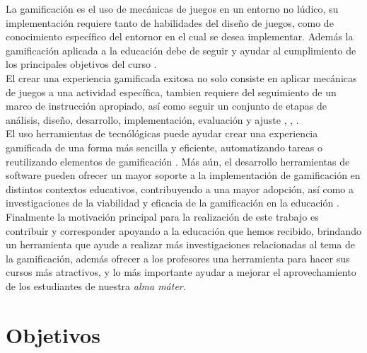 
 \noindent La gamificación es el uso de mecánicas de juegos en un entorno no lúdico, su implementación requiere
 tanto de habilidades del diseño de juegos, como de conocimiento específico del entornor en el cual se desea
 implementar. Además la gamificación aplicada a la educación debe de seguir y ayudar al cumplimiento de los
 principales objetivos del curso \cite{ForTheWin}.\\ %


 \noindent El crear una experiencia gamificada exitosa no solo consiste en aplicar mecánicas de juegos a una
 actividad específica, tambien requiere del seguimiento de un marco de instrucción apropiado, así como seguir
 un conjunto de etapas de análisis, diseño, desarrollo, implementación, evaluación y ajuste
 \cite[p. 39]{Octalysis}, \cite[p. 1110]{GamInE-Learning}, \cite{ForTheWin}.\\


 \noindent El uso herramientas de tecnólógicas puede ayudar crear una experiencia gamificada de una
 forma más sencilla y eficiente, automatizando tareas o reutilizando elementos de gamificación \cite{Wood-Reiners}.
 Más aún, el desarrollo herramientas de software pueden ofrecer un mayor soporte a la implementación de
 gamificación en distintos contextos educativos, contribuyendo a una mayor adopción, así como a investigaciones
 de la viabilidad y eficacia de la gamificación en la educación \cite[p. 10]{mappingStudy}.\\


 \noindent Finalmente la motivación principal para la realización de este trabajo es contribuir y corresponder
 apoyando a la educación que hemos recibido, brindando un herramienta que ayude a realizar más investigaciones
 relacionadas al tema de la gamificación, además ofrecer a los profesores una herramienta para hacer sus cursos más
 atractivos, y lo más importante ayudar a mejorar el aprovechamiento de los estudiantes de nuestra {\it alma máter}.



\section{Objetivos} \label{sec:objetivos}

